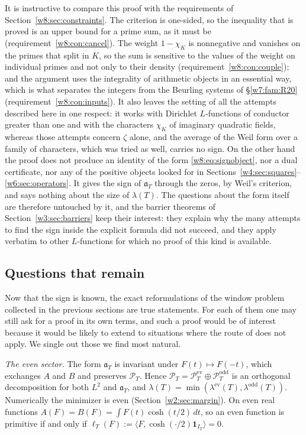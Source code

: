 \documentclass[11pt]{amsart}
\theoremstyle{definition}
\theoremstyle{remark}
\numberwithin{equation}{section}
\newcommand{\IT}{I_T}                                  %
\newcommand{\PT}{\mathcal{P}_T}                        %
\newcommand{\aT}{\mathfrak{a}_T}                       %
\newcommand{\lam}{\lambda(T)}                          %
\begin{document}
It is instructive to compare this proof with the requirements of Section~\ref{w8:sec:constraints}. The criterion
is one-sided, so the inequality that is proved is an upper bound for a prime sum, as it must be
(requirement~\ref{w8:con:cancel}). The weight $1-\chi_K$ is nonnegative and vanishes on the primes that split in
$K$, so the sum is sensitive to the values of the weight on individual primes and not only to their density
(requirement~\ref{w8:con:couple}); and the argument uses the integrality of arithmetic objects in an essential
way, which is what separates the integers from the Beurling systems of \S\ref{w7:fam:R20}
(requirement~\ref{w8:con:inputs}). It also leaves the setting of all the attempts described here in one
respect: it works with Dirichlet $L$-functions of conductor greater than one and with the characters $\chi_K$ of
imaginary quadratic fields, whereas those attempts concern $\zeta$ alone, and the average of the Weil form over
a family of characters, which was tried as well, carries no sign. On the other hand the proof does not produce an identity of the form
\eqref{w8:eq:signobject}, nor a dual certificate, nor any of the positive objects looked for in
Sections~\ref{w4:sec:squares}--\ref{w6:sec:operators}. It gives the sign of $\aT$ through the zeros, by Weil's
criterion, and says nothing about the size of $\lam$. The questions about the form itself are therefore untouched
by it, and the barrier theorems of Section~\ref{w3:sec:barriers} keep their interest: they explain why the many
attempts to find the sign inside the explicit formula did not succeed, and they apply verbatim to other
$L$-functions for which no proof of this kind is available.

\subsection{Questions that remain}

Now that the sign is known, the exact reformulations of the window problem collected in the previous sections
are true statements. For each of them one may still ask for a proof in its own terms, and such a proof would be
of interest because it would be likely to extend to situations where the route of \cite{P46} does not apply. We
single out those we find most natural.

\emph{The even sector.} The form $\aT$ is invariant under $F(t)\mapsto F(-t)$, which exchanges $A$ and $B$ and
preserves $\PT$. Hence $\PT=\PT^{\mathrm{ev}}\oplus\PT^{\mathrm{odd}}$ is an orthogonal decomposition for both
$L^2$ and $\aT$, and $\lam=\min(\lambda^{\mathrm{ev}}(T),\lambda^{\mathrm{odd}}(T))$. Numerically the minimizer
is even (Section~\ref{w2:sec:margin}). On even real functions $A(F)=B(F)=\int F(t)\cosh(t/2)\,dt$, so an even
function is primitive if and only if $\ell_T(F):=\langle F,\cosh(\cdot/2)\mathbf 1_{\IT}\rangle=0$.
\end{document}
